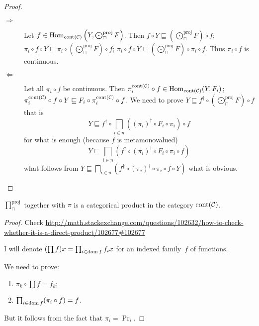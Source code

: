 \begin{proof}
  ~
  \begin{description}
    \item[$\Rightarrow$] Let $f \in \operatorname{Hom}_{\operatorname{cont}
    (\mathcal{C})} \left( Y , \bigodot^{\text{proj}}_{\sqcap} F \right)$. Then $f \circ Y
    \sqsubseteq \left( \bigodot^{\text{proj}}_{\sqcap} F \right) \circ f$; $\pi_i \circ f \circ Y
    \sqsubseteq \pi_i \circ \left( \bigodot^{\text{proj}}_{\sqcap} F \right) \circ f$; $\pi_i
    \circ f \circ Y \sqsubseteq \left( \bigodot^{\text{proj}}_{\sqcap} F \right) \circ \pi_i \circ
    f$. Thus $\pi_i \circ f$ is continuous.
    
    \item[$\Leftarrow$] Let all $\pi_i \circ f$ be continuous. Then
    $\pi^{\operatorname{cont} (\mathcal{C})}_i \circ f \in
    \operatorname{Hom}_{\operatorname{cont} (\mathcal{C})} (Y , F_i)$;
    $\pi^{\operatorname{cont} (\mathcal{C})}_i \circ f \circ Y \sqsubseteq
    F_i \circ \pi^{\operatorname{cont} (\mathcal{C})}_i \circ f$. We need
    to prove $Y \sqsubseteq f^{\dagger} \circ \left( \bigodot^{\text{proj}}_{\sqcap} F \right)
    \circ f$ that is
    \[ Y \sqsubseteq f^{\dagger} \circ \bigsqcap_{i \in n} ((\pi_i)^{\dagger}
       \circ F_i \circ \pi_i) \circ f \]
    for what is enough (because $f$ is metamonovalued)
    \[ Y \sqsubseteq \bigsqcap_{i \in n} (f^{\dagger} \circ (\pi_i)^{\dagger}
       \circ F_i \circ \pi_i \circ f) \]
    what follows from $Y \sqsubseteq \bigsqcap_{i \in n} (f^{\dagger} \circ
    (\pi_i)^{\dagger} \circ \pi_i \circ f \circ Y)$ what is obvious.
  \end{description}
\end{proof}

\begin{thm}\label{cont-pr-pr}
$\prod^{\text{proj}}_{\sqcap}$ together with $\pi$ is a categorical product in the category $\operatorname{cont} (\mathcal{C})$.
\end{thm}

\begin{proof}
Check
\url{http://math.stackexchange.com/questions/102632/how-to-check-whether-it-is-a-direct-product/102677\#102677}

I will denote $(\prod f)x=\prod_{i\in\operatorname{dom} f}f_i x$ for an
indexed family~$f$ of functions.

We need to prove:
\begin{enumerate}
\item $\pi_k\circ\prod f=f_k$;
\item $\prod_{i\in\operatorname{dom} f}(\pi_i\circ f)=f$.
\end{enumerate}
But it follows from the fact that $\pi_i=\Pr_i$.
\end{proof}

